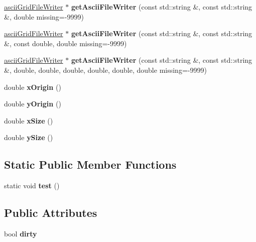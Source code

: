 \begin{DoxyCompactItemize}
\item 
\mbox{\label{classsearchGrid_a168c428c3266f675c136f74de18eaf1d}} 
\mbox{\hyperlink{classasciiGridFileWriter}{ascii\+Grid\+File\+Writer}} $\ast$ {\bfseries get\+Ascii\+File\+Writer} (const std\+::string \&, const std\+::string \&, double missing=-\/9999)
\item 
\mbox{\label{classsearchGrid_ab4656e09087dd116575ddf4398993b21}} 
\mbox{\hyperlink{classasciiGridFileWriter}{ascii\+Grid\+File\+Writer}} $\ast$ {\bfseries get\+Ascii\+File\+Writer} (const std\+::string \&, const std\+::string \&, const double, double missing=-\/9999)
\item 
\mbox{\label{classsearchGrid_a6fa9553dcdcdf8c7560e1d3f47b44029}} 
\mbox{\hyperlink{classasciiGridFileWriter}{ascii\+Grid\+File\+Writer}} $\ast$ {\bfseries get\+Ascii\+File\+Writer} (const std\+::string \&, const std\+::string \&, double, double, double, double, double, double missing=-\/9999)
\item 
\mbox{\label{classsearchGrid_a949147bca8cf28dacf337e699fae0cb2}} 
double {\bfseries x\+Origin} ()
\item 
\mbox{\label{classsearchGrid_a65ff7a575de3afc49a95a3cc77fb3599}} 
double {\bfseries y\+Origin} ()
\item 
\mbox{\label{classsearchGrid_ab8c31f776c01275a1ff0af09b763ee40}} 
double {\bfseries x\+Size} ()
\item 
\mbox{\label{classsearchGrid_a5c9c7f02ef536ac97f7195091539fd9d}} 
double {\bfseries y\+Size} ()
\end{DoxyCompactItemize}
\subsection*{Static Public Member Functions}
\begin{DoxyCompactItemize}
\item 
\mbox{\label{classsearchGrid_ae2382291485f9cd84753ba2ed54ebaf1}} 
static void {\bfseries test} ()
\end{DoxyCompactItemize}
\subsection*{Public Attributes}
\begin{DoxyCompactItemize}
\item 
\mbox{\label{classsearchGrid_aa3e3842edf57c7952163ca0e0d2f2558}} 
bool {\bfseries dirty}
\end{DoxyCompactItemize}
